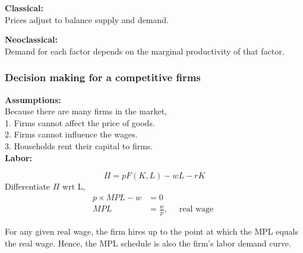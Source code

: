 \documentclass[12pt]{article}
\begin{document}
{\textbf {Classical:}}\\
Prices adjust to balance supply and demand.

{\textbf {Neoclassical:}}\\
Demand for each factor depends on the marginal productivity of that factor.


\subsubsection{Decision making for a competitive firms}
{\textbf {Assumptions:}}\\
Because there are many firms in the market,\\
1. Firms cannot affect the price of goods.\\
2. Firms cannot influence the wages.\\
3. Households rent their capital to firms.\\


{\textbf {Labor:}}

\begin{equation*}
\Pi = pF(K,L) - wL - rK
\end{equation*}
Differentiate $ \Pi $ wrt L,
\begin{align*}
p  \times MPL  - w &= 0\\
MPL &= \frac{w}{p}, \quad \text{ real wage }
\end{align*}

For any given real wage, the firm hires up to the point at which the MPL equals the 
real wage. Hence, the MPL schedule is also the firm’s labor demand curve.

\begin{figure}[H]
\end{figure}
\end{document}
